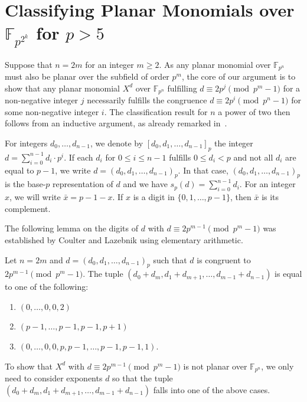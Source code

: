 \documentclass[12pt]{article}
\newcommand{\comp}[1]{\bar{#1}}
\newcommand{\F}{\mathbb{F}}
\newcommand{\wt}{s_p}
\begin{document}
\section{Classifying Planar Monomials over \texorpdfstring{$\F_{p^{2^k}}$ for $p>5$}{Finite Fields of Degree 2ᵏ}}
Suppose that $n = 2m$ for an integer $m \geq 2$.
As any planar monomial over $\F_{p^n}$ must also be planar over the subfield of order $p^m$, the core of our argument is to show that any planar monomial $X^d$ over $\F_{p^n}$ fulfilling $d \equiv 2p^j \pmod {p^m-1}$ for a non-negative integer $j$ necessarily fulfills the congruence $d \equiv 2p^i \pmod {p^n-1}$ for some non-negative integer $i$. The classification result for $n$ a power of two then follows from an inductive argument, as already remarked in~\cite{DBLP:journals/ffa/CoulterL12}.

For integers $d_0,\dots,d_{n-1}$,
we denote by $[d_0,d_1,\dots,d_{n-1}]_p$ the integer $d = \sum_{i=0}^{n-1} d_i \cdot p^i$. If each $d_i$ for $0 \leq i \leq n-1$ fulfills $0 \leq d_i < p$ and not all $d_i$ are equal to $p-1$, we write $d = (d_0,d_1,\dots,d_{n-1})_p$. In that case, $(d_0,d_1,\dots,d_{n-1})_p$ is the base-$p$ representation of $d$ and we have $\wt(d) = \sum_{i=0}^{n-1} d_i$. For an integer $x$, we will write $\comp{x} = p - 1 - x$. If $x$ is a digit in $\{0, 1, \ldots, p - 1\}$, then $\comp{x}$ is its complement.

The following lemma on the digits of $d$ with $d \equiv 2p^{m-1} \pmod {p^m-1}$ was established by Coulter and Lazebnik using elementary arithmetic.

\begin{lemma}
\label{lem:coulter_lazebnik}
    Let $n = 2m$ and $d = (d_0,d_1,\dots,d_{n-1})_p$ such that $d$ is congruent to $2p^{m-1} \pmod {p^m-1}$. The tuple $(d_0 + d_m, d_1+d_{m+1},\dots,d_{m-1}+d_{n-1})$ is equal to one of the following:\begin{enumerate}
        \item $(0,\dots,0,0,2)$
        \item $(p-1,\dots,p-1,p-1,p+1)$
        \item $(0,\dots,0,0,p,p-1,\dots,p-1,p-1,1)$.
    \end{enumerate}
\end{lemma}

To show that $X^{d}$ with $d \equiv 2p^{m-1} \pmod {p^m-1}$ is not planar over $\F_{p^n}$, we only need to consider exponents $d$ so that the tuple $(d_0+d_m,d_1+d_{m+1},\dots,d_{m-1}+d_{n-1})$ falls into one of the above cases.
\end{document}

